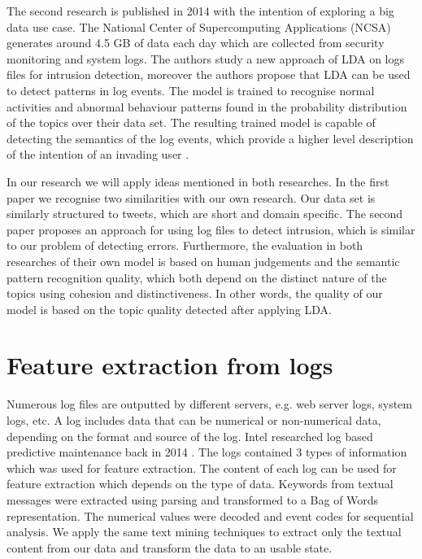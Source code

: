 \newpage
The second research is published in 2014 with the intention of exploring a big data use case. The National Center of Supercomputing Applications (NCSA) generates around 4.5 GB of data each day which are collected from security monitoring and system logs. The authors study a new approach of LDA on logs files for intrusion detection, moreover the authors propose that LDA can be used to detect patterns in log events. The model is trained to recognise normal activities and abnormal behaviour patterns found in the probability distribution of the topics over their data set. The resulting trained model is capable of detecting the semantics of the log events, which provide a higher level description of the intention of an invading user \cite{Jingwei2014KnowledgeLDA}. 

In our research we will apply ideas mentioned in both researches. In the first paper we recognise two similarities with our own research. Our data set is similarly structured to tweets, which are short and domain specific. The second paper proposes an approach for using log files to detect intrusion, which is similar to our problem of detecting errors. Furthermore, the evaluation in both researches of their own model is based on human judgements and the semantic pattern recognition quality, which both depend on the distinct nature of the topics using cohesion and distinctiveness. In other words, the quality of our model is based on the topic quality detected after applying LDA.

\section{Feature extraction from logs}\label{research:featureextraction}
Numerous log files are outputted by different servers, e.g. web server logs, system logs, etc. A log includes data that can be numerical or non-numerical data, depending on the format and source of the log. Intel researched log based predictive maintenance back in 2014 \cite{Sipos2014Log-basedMaintenance}. The logs contained 3 types of information which was used for feature extraction. 
The content of each log can be used for feature extraction which depends on the type of data.
Keywords from textual messages were extracted using parsing and transformed to a Bag of Words representation. The numerical values were decoded and event codes for sequential analysis. We apply the same text mining techniques to extract only the textual content from our data and transform the data to an usable state.

